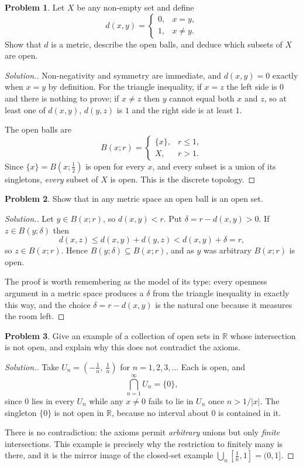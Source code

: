\documentclass[11pt,a4paper]{article}
\theoremstyle{definition}
\newtheorem{problemx}{Problem}[subsection]
\newenvironment{problem}{\begin{problemx}}{\end{problemx}}
\newenvironment{solution}
  {\renewcommand{\qedsymbol}{}\begin{proof}[\textit{Solution}.]}
  {\end{proof}}
\begin{document}
\begin{problem}
Let $X$ be any non-empty set and define
$$d(x,y) = \begin{cases} 0, & x=y,\\ 1, & x\neq y.\end{cases}$$
Show that $d$ is a metric, describe the open balls, and deduce which subsets of
$X$ are open.
\end{problem}
\begin{solution}
Non-negativity and symmetry are immediate, and $d(x,y)=0$ exactly when $x=y$ by
definition. For the triangle inequality, if $x=z$ the left side is $0$ and there
is nothing to prove; if $x\neq z$ then $y$ cannot equal both $x$ and $z$, so at
least one of $d(x,y)$, $d(y,z)$ is $1$ and the right side is at least $1$.

The open balls are
$$B(x;r) = \begin{cases}\{x\}, & r\leq 1,\\ X, & r>1.\end{cases}$$
Since $\{x\} = B\left(x;\tfrac12\right)$ is open for every $x$, and every subset
is a union of its singletons, \emph{every} subset of $X$ is open. This is the
discrete topology.
\end{solution}

\begin{problem}
Show that in any metric space an open ball is an open set.
\end{problem}
\begin{solution}
Let $y\in B(x;r)$, so $d(x,y)<r$. Put $\delta = r - d(x,y) > 0$. If
$z\in B(y;\delta)$ then
$$d(x,z) \leq d(x,y) + d(y,z) < d(x,y) + \delta = r ,$$
so $z\in B(x;r)$. Hence $B(y;\delta)\subseteq B(x;r)$, and as $y$ was arbitrary
$B(x;r)$ is open.

The proof is worth remembering as the model of its type: every openness argument
in a metric space produces a $\delta$ from the triangle inequality in exactly
this way, and the choice $\delta = r - d(x,y)$ is the natural one because it
measures the room left.
\end{solution}

\begin{problem}
Give an example of a collection of open sets in $\mathbb{R}$ whose intersection
is not open, and explain why this does not contradict the axioms.
\end{problem}
\begin{solution}
Take $U_n = \left(-\tfrac1n,\ \tfrac1n\right)$ for $n=1,2,3,\dots$ Each is open,
and
$$\bigcap_{n=1}^{\infty}U_n = \{0\},$$
since $0$ lies in every $U_n$ while any $x\neq0$ fails to lie in $U_n$ once
$n>1/\left|x\right|$. The singleton $\{0\}$ is not open in $\mathbb{R}$, because
no interval about $0$ is contained in it.

There is no contradiction: the axioms permit \emph{arbitrary} unions but only
\emph{finite} intersections. This example is precisely why the restriction to
finitely many is there, and it is the mirror image of the closed-set example
$\bigcup_n\left[\tfrac1n,1\right] = (0,1]$.
\end{solution}
\end{document}
